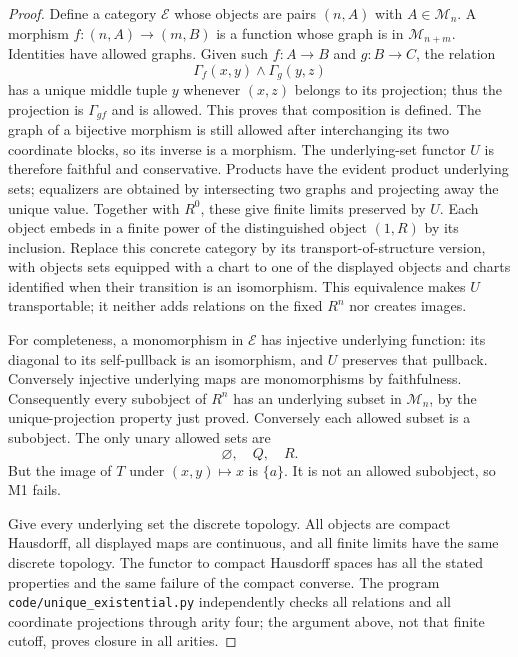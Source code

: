 \begin{proof}
Define a category $\mathcal E$ whose objects are pairs $(n,A)$ with
$A\in\mathcal M_n$. A morphism $f:(n,A)\to(m,B)$ is a function whose
graph is in $\mathcal M_{n+m}$. Identities have allowed graphs. Given
such $f:A\to B$ and $g:B\to C$, the relation
\[
 \Gamma_f(x,y)\wedge\Gamma_g(y,z)
\]
has a unique middle tuple $y$ whenever $(x,z)$ belongs to its projection;
thus the projection is $\Gamma_{gf}$ and is allowed. This proves that
composition is defined. The graph of a bijective morphism is still
allowed after interchanging its two coordinate blocks, so its inverse
is a morphism. The underlying-set functor $U$ is therefore faithful and
conservative. Products have the evident product underlying sets;
equalizers are obtained by intersecting two graphs and projecting away
the unique value. Together with $R^0$, these give finite limits preserved
by $U$. Each object embeds in a finite power of the distinguished object
$(1,R)$ by its inclusion. Replace this concrete category by its
transport-of-structure version, with objects sets equipped with a chart
to one of the displayed objects and charts identified when their
transition is an isomorphism. This equivalence makes $U$ transportable;
it neither adds relations on the fixed $R^n$ nor creates images.

For completeness, a monomorphism in $\mathcal E$ has injective underlying
function: its diagonal to its self-pullback is an isomorphism, and $U$
preserves that pullback. Conversely injective underlying maps are
monomorphisms by faithfulness. Consequently every subobject of $R^n$
has an underlying subset in $\mathcal M_n$, by the unique-projection
property just proved. Conversely each allowed subset is a subobject.
The only unary allowed sets are
\[
 \varnothing,\quad Q,\quad R.
\]
But the image of $T$ under $(x,y)\mapsto x$ is $\{a\}$.
It is not an allowed subobject, so M1 fails.

Give every underlying set the discrete topology. All objects are compact
Hausdorff, all displayed maps are continuous, and all finite limits have
the same discrete topology. The functor to compact Hausdorff spaces
has all the stated properties and the same failure of the compact
converse. The program \texttt{code/unique\_existential.py} independently
checks all relations and all coordinate projections through arity four;
the argument above, not that finite cutoff, proves closure in all arities.
\end{proof}

